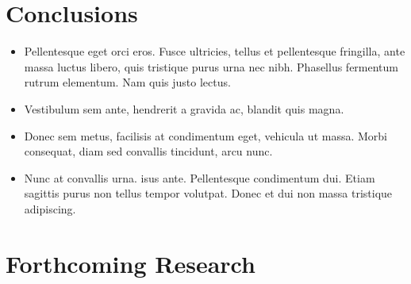\section*{Conclusions}

\begin{itemize}
\item Pellentesque eget orci eros. Fusce ultricies, tellus et pellentesque fringilla, ante massa luctus libero, quis tristique purus urna nec nibh. Phasellus fermentum rutrum elementum. Nam quis justo lectus.
\item Vestibulum sem ante, hendrerit a gravida ac, blandit quis magna.
\item Donec sem metus, facilisis at condimentum eget, vehicula ut massa. Morbi consequat, diam sed convallis tincidunt, arcu nunc.
\item Nunc at convallis urna. isus ante. Pellentesque condimentum dui. Etiam sagittis purus non tellus tempor volutpat. Donec et dui non massa tristique adipiscing.
\end{itemize}



\section*{Forthcoming Research}



